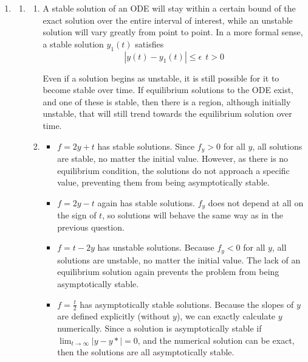 \documentclass[11pt]{article}
\begin{document}
\begin{enumerate}
\begin{enumerate}
		\medskip

	\end{enumerate}

	\item %

	\begin{enumerate}

		\item %

		\begin{enumerate}

			\item A stable solution of an ODE will stay within a certain bound of the exact solution over the entire interval of interest, while an unstable solution will vary greatly from point to point. In a more formal sense, a stable solution $y_1(t)$ satisfies
			\[
			|y(t)-y_1(t)| \leq \epsilon\ \ t > 0
			\]

			Even if a solution begins as unstable, it is still possible for it to become stable over time. If equilibrium solutions to the ODE exist, and one of these is stable, then there is a region, although initially unstable, that will still trend towards the equilibrium solution over time.

			\medskip

			\item

			\begin{itemize}

				\item $f=2y+t$ has stable solutions. Since $f_y > 0$ for all $y$, all solutions are stable, no matter the initial value. However, as there is no equilibrium condition, the solutions do not approach a specific value, preventing them from being asymptotically stable.

				\medskip

				\item $f=2y-t$ again has stable solutions. $f_y$ does not depend at all on the sign of $t$, so solutions will behave the same way as in the previous question.

				\medskip

				\item $f=t-2y$ has unstable solutions. Because $f_y<0$ for all $y$, all solutions are unstable, no matter the initial value. The lack of an equilibrium solution again prevents the problem from being asymptotically stable.

				\medskip

				\item $f=\frac{t}{2}$ has asymptotically stable solutions. Because the slopes of $y$ are defined explicitly (without $y$), we can exactly calculate $y$ numerically. Since a solution is asymptotically stable if $\lim_{t\to\infty}|y-y*| = 0$, and the numerical solution can be exact, then the solutions are all asymptotically stable.


\end{itemize}
\end{enumerate}
\end{enumerate}
\end{enumerate}
\end{document}
